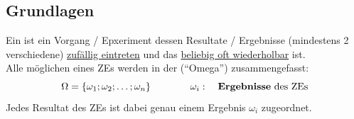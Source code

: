 
\subsection{Grundlagen}

\begin{note}{}
Ein  ist ein Vorgang / Epxeriment dessen Resultate / Ergebnisse (mindestens 2 verschiedene) \uline{zufällig eintreten} und das \uline{beliebig oft wiederholbar} ist.\\[-1.0ex]

Alle möglichen  eines ZEs werden in der  (\textcolor{myg}{``Omega''}) zusammengefasst: 
\begin{equation*} 
    \Omega = \{ \omega_1; \omega_2; \ldots; \omega_n \} \qquad \qquad \omega_{i}: \quad \text{\textbf{Ergebnisse} des ZEs}
\end{equation*}
Jedes Resultat des ZEs ist dabei genau einem Ergebnis $\omega_i$ zugeordnet.


\end{note}
